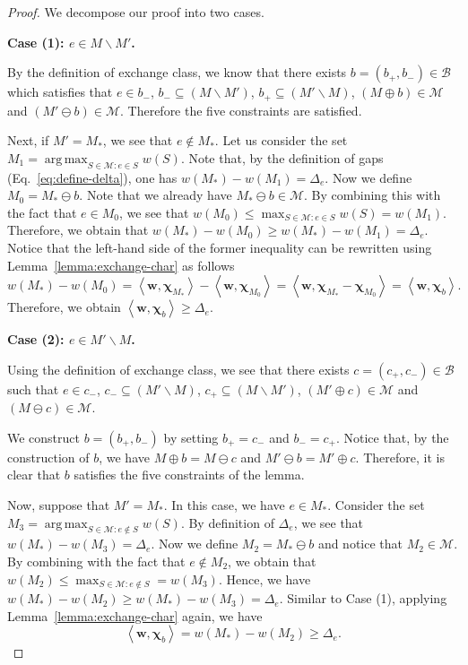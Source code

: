 \documentclass{article}
\newcommand{\M}{\mathcal M}
\newcommand{\B}{\mathcal B}
\newcommand{\del}{\backslash}
\DeclareMathOperator*{\argmax}{arg\,max}
\newcommand{\inn}[1]{\left\langle #1 \right\rangle}
\renewcommand{\vec}[1]{\boldsymbol{#1}}
\begin{document}
\begin{proof}
We decompose our proof into two cases.

\textbf{Case (1): $e\in M\del M'$.}

By the definition of exchange class, we know that 
there exists $b=(b_+, b_-) \in \B$ which satisfies that
$e\in b_-$, $b_- \subseteq (M\del M') $, $b_+\subseteq (M' \del M)$, $(M\oplus b) \in \M$ and $(M'\ominus b) \in \M$.
Therefore the five constraints are satisfied.

Next, if $M'=M_*$, we see that $e\not \in M_*$.
Let us consider the set $M_1 = \argmax_{S \in \M\colon e\in S} w(S)$.
Note that, by the definition of gaps (Eq.~\eqref{eq:define-delta}), one has $w(M_*)-w(M_1) = \Delta_e$.
Now we define $M_0 = M_*\ominus b$. 
Note that we already have  $M_* \ominus b \in \M$.  
By combining this with the fact that $e\in M_0$, we see that $w(M_0) \le \max_{S\in \M\colon e\in S} w(S) = w(M_1)$. 
Therefore, we obtain that
$w(M_*)-w(M_0) \ge w(M_*)-w(M_1) = \Delta_e$.
Notice that the left-hand side of the former inequality can be rewritten using Lemma~\ref{lemma:exchange-char} as follows
$$
w(M_*)-w(M_0) = \inn{\vec w, \vec \chi_{M_*}}-\inn{\vec w, \vec \chi_{M_0}} = \inn{\vec w, \vec \chi_{M_*}-\vec\chi_{M_0}}
= \inn{\vec w,\vec \chi_b}.
$$
Therefore, we obtain $\inn{\vec w,\vec \chi_b} \ge \Delta_e$.

\textbf{Case (2): $e\in M'\del M$.}

Using the definition of exchange class, we see that 
there exists $c=(c_+,c_-)\in \B$ such that 
$e\in c_-$, $c_-\subseteq (M'\del M)$, $c_+\subseteq (M\del M')$, $(M'\oplus c)\in \M$
and $(M\ominus c)\in \M$.

We construct $b=(b_+,b_-)$ by setting $b_+=c_-$ and $b_-=c_+$. 
Notice that, by the construction of $b$, we have $M\oplus b = M\ominus c$ and $M'\ominus b = M'\oplus c$.
Therefore, it is clear that $b$ satisfies the five constraints of the lemma.


Now, suppose that $M'=M_*$. 
In this case, we have $e\in M_*$.
Consider the set $M_3 = \argmax_{S \in \M\colon e\not \in S} w(S)$.
By definition of $\Delta_e$, we see that $w(M_*)-w(M_3)=\Delta_e$.
Now we define $M_2 = M_* \ominus b$ and notice that  $M_2 \in \M$.
By combining with the fact that $e\not \in M_2$, we obtain that $w(M_2) \le \max_{S\in \M\colon e\not\in S} = w(M_3)$.
Hence, we have
$w(M_*)-w(M_2) \ge w(M_*)-w(M_3)=\Delta_e$.
Similar to Case (1), applying Lemma~\ref{lemma:exchange-char} again, we have
$$
\inn{\vec w,\vec \chi_b} = w(M_*)-w(M_2) \ge \Delta_e.
$$
\end{proof}
\end{document}
